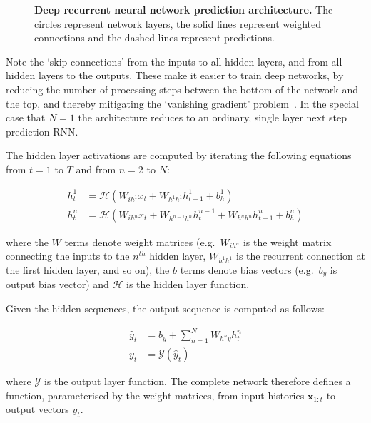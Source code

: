 \begin{figure}
\begin{center}

\end{center}
\caption[Deep recurrent neural network prediction architecture.]{\textbf{Deep recurrent neural network prediction architecture.} The circles represent network layers, the solid lines represent weighted connections and the dashed lines represent predictions.}
\label{fig:deep_predictor}
\end{figure}

Note the `skip connections' from the inputs to all hidden layers, and from all hidden layers to the outputs. These make it easier to train deep networks, by reducing the number of processing steps between the bottom of the network and the top, and thereby mitigating the `vanishing gradient' problem~\cite{bengio94learning}. In the special case that $N=1$ the architecture reduces to an ordinary, single layer next step prediction RNN.

The hidden layer activations are computed by iterating the following equations from $t=1$ to $T$ and from $n=2$ to $N$:

\begin{align}
\label{eq:pred_hidden}
h^1_t &= \mathcal{H}\left(W_{i h^1} x_t + W_{h^{1}h^{1}} h^1_{t-1} + b_{h}^1 \right)\\
h^n_t &= \mathcal{H}\left(W_{i h^n} x_t + W_{h^{n-1}h^{n}} h^{n-1}_t + W_{h^{n}h^{n}} h^n_{t-1} + b_{h}^n \right)
\end{align}

 
where the $W$ terms denote weight matrices (e.g.\ $W_{i h^n}$ is the weight matrix connecting the inputs to the $n^{th}$ hidden layer, $W_{h^{1}h^{1}}$ is the recurrent connection at the first hidden layer, and so on), the $b$ terms denote bias vectors (e.g.\ $b_{y}$ is output bias vector) and $\mathcal{H}$ is the hidden layer function. 

Given the hidden sequences, the output sequence is computed as follows:

\begin{align}
\label{eq:pred_output}
\hat{y}_t &= b_{y} + \sum_{n=1}^N{W_{h^n y} h^n_t}\\
y_t &= \mathcal{Y}(\hat{y}_t)	
\end{align}

where $\mathcal{Y}$ is the output layer function. The complete network therefore defines a function, parameterised by the weight matrices, from input histories $\mathbf{x}_{1:t}$ to output vectors $y_t$.

